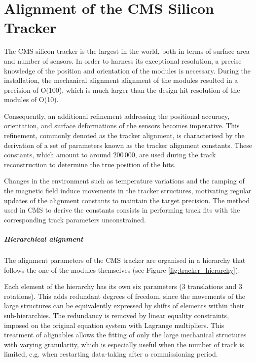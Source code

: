 \chapter{Alignment of the CMS Silicon Tracker}

The CMS silicon tracker is the largest in the world, both in terms of surface area and number of sensors.
In order to harness its exceptional resolution, a precise knowledge of the position and orientation of the modules is necessary.
During the installation, the mechanical alignment alignment of the modules resulted in a precision of O(100\mum),
which is much larger than the design hit resolution of the modules of O(10\mum).

Consequently, an additional refinement addressing the positional accuracy, orientation, and surface deformations of the sensors becomes imperative.
This refinement, commonly denoted as the tracker alignment, is characterised by the derivation of a set of parameters known as the tracker alignment constants.
These constants, which amount to around $200\,000$, are used during the track reconstruction to determine the true position of the hits.

Changes in the environment such as temperature variations and the ramping of the magnetic field induce movements in the tracker structures,
motivating regular updates of the alignment constants to maintain the target precision.
The method used in CMS to derive the constants consists in performing track fits with the corresponding track parameters unconstrained.

\paragraph{Hierarchical alignment\\}
The alignment parameters of the CMS tracker are organised in a hierarchy that follows the one of the modules themselves (see Figure \ref{fig:tracker_hierarchy}).

Each element of the hierarchy has its own six parameters (3 translations and 3 rotations).
This adds redundant degrees of freedom, since the movements of the large structures can be equivalently expressed by shifts of elements within their sub-hierarchies.
The redundancy is removed by linear equality constraints, imposed on the original equation system with Lagrange multipliers.
This treatment of alignables allows the fitting of only the large mechanical structures with varying granularity,
which is especially useful when the number of track is limited, e.g. when restarting data-taking after a commissioning period.

